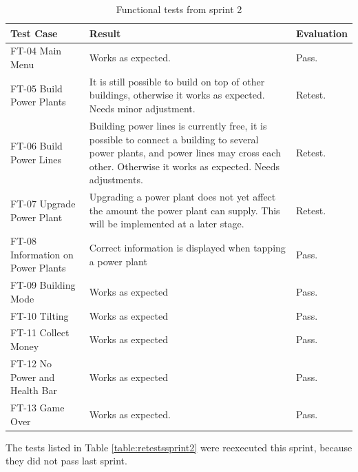 
	\begin{table}[H]
	\begin{tabular}{| p{3cm} | p{6.5cm} | p{2.5cm} |}
		\hline
		\rowcolor{lightgray}
		{\bf Test Case} & {\bf Result} & {\bf Evaluation} \\ \hline
	  	
	  	FT-04 Main Menu & Works as expected. & Pass. \\ \hline

		FT-05 Build Power Plants & It is still possible to build on top of other buildings, otherwise it works as expected. Needs minor adjustment. &  Retest. \\ \hline

		FT-06 Build Power Lines & Building power lines is currently free, it is possible to connect a building to several power plants, and power lines may cross each other. Otherwise it works as expected. Needs adjustments.  & Retest. \\ \hline

		FT-07 Upgrade Power Plant & Upgrading a power plant does not yet affect the amount the power plant can supply. This will be implemented at a later stage. & Retest. \\ \hline

		FT-08 Information on Power Plants & Correct information is displayed when tapping a power plant & Pass.\\ \hline

		FT-09 Building Mode & Works as expected & Pass. \\ \hline

		FT-10 Tilting & Works as expected & Pass. \\ \hline

		FT-11 Collect Money & Works as expected & Pass. \\ \hline

		FT-12 No Power and Health Bar & Works as expected & Pass. \\ \hline

		FT-13 Game Over & Works as expected. & Pass. \\ \hline

	\end{tabular}
	\caption{Functional tests from sprint 2}
	\label{table:testssprint2}
	\end{table}

	The tests listed in Table \ref{table:retestssprint2} were reexecuted this sprint, because they did not pass last sprint.

